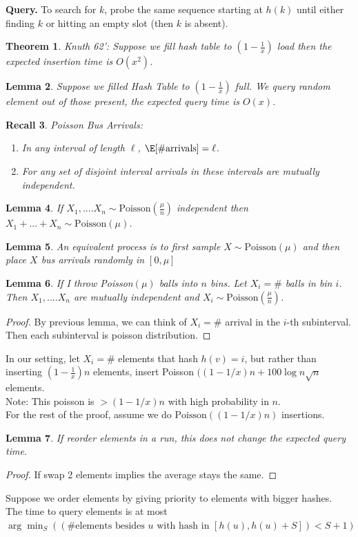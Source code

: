 \documentclass[a4paper]{article}
\newtheorem{thm}{Theorem}[section]
\newtheorem{lem}[thm]{Lemma}
\newtheorem{rec}[thm]{Recall}
\begin{document}
\medskip
\noindent\textbf{Query.} To search for $k$, probe the same sequence starting at $h(k)$ until either finding $k$ or hitting an empty slot (then $k$ is absent).
\begin{thm}
    Knuth 62': Suppose we fill hash table to $(1-\frac{1}{x})$ load then the expected insertion time is $O \left( x^2 \right)$. 
\end{thm}
\begin{lem}
    Suppose we filled Hash Table to $ \left( 1-\frac{1}{x} \right)$ full. We query random element out of those present, the expected query time is $O(x)$. 
\end{lem}
\begin{rec}
    Poisson Bus Arrivals:
    \begin{enumerate}
        \item In any interval of length $\ell$, $\E[\# \text{arrivals}]=\ell$. 
        \item For any set of disjoint interval arrivals in these intervals are mutually independent. 
    \end{enumerate}
\end{rec}
\begin{lem}
    If $X_1,....X_n\sim \text{Poisson} \left(  \frac{\mu}{n} \right)$ independent then $X_1+...+X_n\sim \text{Poisson} \left( \mu \right)$. 
\end{lem}
\begin{lem}
    An equivalent process is to first sample $X\sim \text{Poisson} \left( \mu \right)$ and then place $X$ bus arrivals randomly in $[0,\mu]$
\end{lem}
\begin{lem}
    If I throw Poisson$(\mu)$ balls into $n$ bins. Let $X_i=\#$ balls in bin $i$. Then $X_1,....X_n$ are mutually independent and $X_i\sim \text{Poisson} \left( \frac{\mu}{n} \right)$. 
\end{lem}
\begin{proof}
    By previous lemma, we can think of $X_i=\#$ arrival in the $i$-th subinterval. Then each subinterval is poisson distribution. 
\end{proof}
In our setting, let $X_i=\#$ elements that hash $h(v)=i$, but rather than inserting $ \left( 1-\frac{1}{x} \right)n$ elements, insert Poisson $((1-1/x)n+100\log n\sqrt{n}$ elements. \\
Note: This poisson is $>(1-1/x)n$ with high probability in $n$. \\
For the rest of the proof, assume we do $\text{Poisson}((1-1/x)n)$ insertions. 
\begin{lem}
    If reorder elements in a run, this does not change the expected query time. 
\end{lem}
\begin{proof}
    If swap 2 elements implies the average stays the same. 
\end{proof}
Suppose we order elements by giving priority to elements with bigger hashes. \\
The time to query elements is at most $\arg\min_S ((\# \text{elements besides $u$ with hash in }[h(u),h(u)+S])<S+1)$
\newpage
\end{document}
